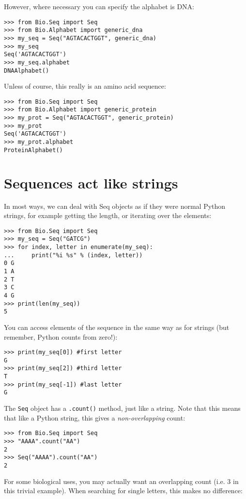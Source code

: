 However, where necessary you can specify the alphabet is DNA:

\begin{verbatim}
>>> from Bio.Seq import Seq
>>> from Bio.Alphabet import generic_dna
>>> my_seq = Seq("AGTACACTGGT", generic_dna)
>>> my_seq
Seq('AGTACACTGGT')
>>> my_seq.alphabet
DNAAlphabet()
\end{verbatim}

Unless of course, this really is an amino acid sequence:

\begin{verbatim}
>>> from Bio.Seq import Seq
>>> from Bio.Alphabet import generic_protein
>>> my_prot = Seq("AGTACACTGGT", generic_protein)
>>> my_prot
Seq('AGTACACTGGT')
>>> my_prot.alphabet
ProteinAlphabet()
\end{verbatim}

\section{Sequences act like strings}

In most ways, we can deal with Seq objects as if they were normal Python strings, for example getting the length, or iterating over the elements:

\begin{verbatim}
>>> from Bio.Seq import Seq
>>> my_seq = Seq("GATCG")
>>> for index, letter in enumerate(my_seq):
...     print("%i %s" % (index, letter))
0 G
1 A
2 T
3 C
4 G
>>> print(len(my_seq))
5
\end{verbatim}

You can access elements of the sequence in the same way as for strings (but remember, Python counts from zero!):

\begin{verbatim}
>>> print(my_seq[0]) #first letter
G
>>> print(my_seq[2]) #third letter
T
>>> print(my_seq[-1]) #last letter
G
\end{verbatim}

The \verb|Seq| object has a \verb|.count()| method, just like a string.
Note that this means that like a Python string, this gives a
\emph{non-overlapping} count:

\begin{verbatim}
>>> from Bio.Seq import Seq
>>> "AAAA".count("AA")
2
>>> Seq("AAAA").count("AA")
2
\end{verbatim}

\noindent For some biological uses, you may actually want an overlapping count
(i.e. $3$ in this trivial example). When searching for single letters, this
makes no difference:

